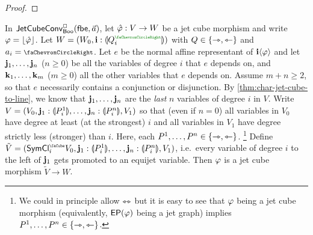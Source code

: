 \documentclass[a4paper]{memoir}
\begin{document}
\begin{proof}
%		
%		
\end{proof}
\begin{lemma} \label{thm:left-of-connection}
	In $\mathsf{JetCubeConv}^{\Box}_{\mathsf{Boo}}\mathopen{}\left( {\mathsf{fbe}},\vec a \right)\mathclose{}$, let $\hat {\varphi} : V \to W$ be a jet cube morphism and write $\varphi = \mathopen{}\left\lfloor \hat {\varphi} \right\rfloor\mathclose{}$.
	Let $W = (W_0, \dm i : \rival{Q_i\pmr{\ypolar}})$ with $Q \in \mathopen{}\left\{ \rightarrowtriangle, \leftarrowtriangle \right\}\mathclose{}$ and $a_i = \ypolar$.
	Let $e$ be the normal affine representant of $\mathbf{i} \langle \varphi \rangle$ and let $\mathbf{j}_1, \ldots, \mathbf{j}_n$ ($n \geq 0$) be all the variables of degree $i$ that $e$ depends on, and $\mathbf{k}_1, \ldots, \mathbf{k}_m$ ($m \geq 0$) all the other variables that $e$ depends on.
	Assume $m+n \geq 2$, so that $e$ necessarily contains a conjunction or disjunction.
	By \cref{thm:char-jet-cube-to-line}, we know that $\mathbf{j}_1, \ldots, \mathbf{j}_n$ are the \emph{last} $n$ variables of degree $i$ in $V$.
	Write $V = (V_0, \mathbf{j}_1 : {\llparenthesis P^1_i \rrparenthesis}, \ldots, \mathbf{j}_n : {\llparenthesis P^n_i \rrparenthesis}, V_1)$ so that (even if $n = 0$) all variables in $V_0$ have degree at least (at the strongest) $i$ and all variables in $V_1$ have degree strictly less (stronger) than $i$.
	Here, each $P^1, \ldots, P^n \in \mathopen{}\left\{ \rightarrowtriangle, \leftarrowtriangle \right\}\mathclose{}$.%
	\footnote{We could in principle allow $\leftrightarrowtriangle$ but it is easy to see that $\varphi$ being a jet cube morphism (equivalently, $\mathsf{EP}(\varphi)$ being a jet graph) implies $P^1, \ldots, P^n \in \mathopen{}\left\{ \rightarrowtriangle, \leftarrowtriangle \right\}\mathclose{}$.}
	Define $\tilde V = (\UFsymcube_i V_0, \dm j_1 : \rival{P^1_i}, \ldots, \dm j_n : \rival{P^n_i}, V_1)$, i.e.\ every variable of degree $i$ to the left of $\mathbf{j}_1$ gets promoted to an equijet variable.
	Then $\varphi$ is a jet cube morphism $\tilde V \to W$.
\end{lemma}
\end{document}
